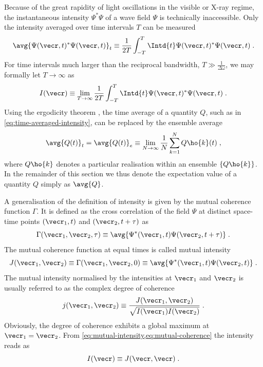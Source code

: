 \documentclass[
twoside,
openright,
titlepage,
numbers=noenddot,
headinclude,
fleqn,
a4paper,
footinclude=true,
cleardoublepage=empty,
abstractoff,
BCOR=5mm,
paper=a4,
fontsize=11pt,
british,ngerman,american,
]{scrreprt}
\begin{document}
Because of the great rapidity of light oscillations in the visible or
X-ray regime, the instantaneous intensity $\Psi^*\Psi$ of a wave field
$\Psi$ is technically inaccessible.  Only the intensity averaged over
time intervals $T$ can be measured
\begin{equation}
  \label{eq:time-averaged-intensity}
  \avg{\Psi(\vecr,t)^*\Psi(\vecr,t)}_t \equiv 
  \frac{1}{2 T}\int_{-T}^T\Intd{t} \Psi(\vecr,t)^*\Psi(\vecr,t) \;.
\end{equation}
For time intervals much larger than the reciprocal bandwidth,
$T\gg\frac{1}{\Delta \omega}$, we may formally let $T\to\infty$ as
\begin{equation}
  \label{eq:time-averaged-intensity-infty}
  I(\vecr) \equiv \lim_{T\to\infty} \frac{1}{2 T}
  \int_{-T}^T\Intd{t} \Psi(\vecr,t)^*\Psi(\vecr,t) \;.
\end{equation}
Using the ergodicity theorem \cite{Boltzmann1898}, the time average of
a quantity $Q$, such as in \cref{eq:time-averaged-intensity}, can be
replaced by the ensemble average \cite{Wolf}
\begin{equation}
  \label{eq:ensemble-average}
  \avg{Q(t)}_t = \avg{Q(t)}_e \equiv 
  \lim_{N\to\infty} \frac{1}{N}\sum_{k=1}^{N}Q\ho{k}(t)\;,
\end{equation}
where $Q\ho{k}$ denotes a particular realisation within an ensemble
$\{Q\ho{k}\}$.  In the remainder of this section we thus denote the
expectation value of a quantity $Q$ simply as $\avg{Q}$.

A generalisation of the definition of intensity is given by the mutual
coherence function $\Gamma$.  It is defined as the cross correlation
of the field $\Psi$ at distinct space-time points $(\vecr_1,t)$ and
$(\vecr_2,t+\tau)$ as
\begin{equation}
  \label{eq:mutual-coherence}
  \Gamma(\vecr_1,\vecr_2,\tau) \equiv
  \avg{\Psi^*(\vecr_1,t)\Psi(\vecr_2,t+\tau)} \;.
\end{equation}
The mutual coherence function at equal times is called mutual
intensity
\begin{equation}
  \label{eq:mutual-intensity}
  J(\vecr_1,\vecr_2)\equiv  \Gamma(\vecr_1,\vecr_2,0) \equiv
  \avg{\Psi^*(\vecr_1,t)\Psi(\vecr_2,t)} \;.
\end{equation}
The mutual intensity normalised by the intensities at $\vecr_1$ and
$\vecr_2$ is usually referred to as the complex degree of coherence
\begin{equation}
  \label{eq:complex-degree}
    j(\vecr_1,\vecr_2) \equiv 
    \frac{J(\vecr_1,\vecr_2)}{\sqrt{I(\vecr_1)I(\vecr_2)}} \;.
\end{equation}
Obviously, the degree of coherence exhibits a global maximum at
$\vecr_1=\vecr_2$.  From
\cref{eq:mutual-intensity,eq:mutual-coherence} the intensity reads as
\begin{equation}
  \label{eq:intensity-3}
  I(\vecr) \equiv J(\vecr,\vecr) \;.
\end{equation}
\end{document}
